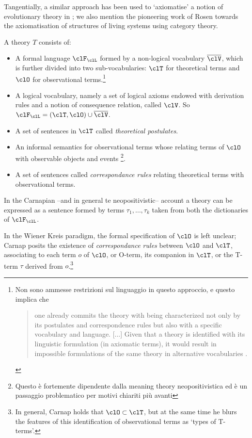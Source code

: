 Tangentially, a similar approach has been used to `axiomatise' a notion of evolutionary theory in \cite{biologia}; we also mention the pioneering work of Rosen \cite{} towards the axiomatisation of structures of living systems using category theory.
\begin{definition} \cite{krause-foundation}
	A theory $T$ consists of:
	\begin{itemize}
	\item A formal language $\clF_\clL$ formed by a non-logical vocabulary $\overline{\clV}$, which is further divided into two sub-vocabularies: $\clT$ for theoretical terms and $\clO$ for observational terms.\footnote{Non sono ammesse restrizioni sul linguaggio in questo approccio, e questo implica che 
	\begin{quotation}
		one already commits the theory with being characterized not only by its postulates and correspondence rules but also with a specific vocabulary and language. [...] Given that a theory is identified with its linguistic formulation (in axiomatic terms), it would result in impossible formulations of the same theory in alternative vocabularies \cite{krause-foundation}.
	\end{quotation}}
	\item A logical vocabulary, namely a set of logical axioms endowed with derivation rules and a notion of consequence relation, called $\clV$. So $\clF_\clL= (\clT,\clO) \cup \overline{\clV}$.
	\item A set of sentences in $\clT$ called \emph{theoretical postulates}.
	\item An informal semantics for observational terms whose relating terms of $\clO$ with observable objects and events \footnote{Questo è fortemente dipendente dalla meaning theory neopositivistica \cite{} ed è un passaggio problematico per motivi chiariti più avanti}. 
	\item A set of sentences called \emph{correspondance rules} relating theoretical terms with observational terms. 
	\end{itemize}    
\end{definition}
In the Carnapian --and in general te neopositivistic-- account a theory can be expressed as a sentence formed by terms $\tau_1, \dots, \tau_k$ taken from both the dictionaries of $\clF_\clL$. 

In the Wiener Kreis paradigm, the formal specification of $\clO$ is left unclear; Carnap \cite{carnapfound} posits the existence of \emph{correspondance rules} between $\clO$ and $\clT$, associating to each term $o$ of $\clO$, or O-term, its companion in $\clT$, or the T-term $\tau$ derived from $o$.\footnote{In general, Carnap holds that $\clO \subset \clT$, but at the same time he blurs the features of this identification of observational terms as `types of T-terms'.}

